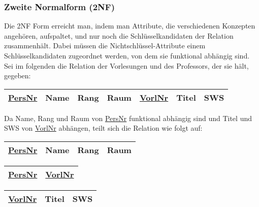 \documentclass[a4paper,parskip=half*,DIV=15,fontsize=11pt]{scrartcl}
\newlength{\currentparskip}
\newenvironment{minipageparskip}
  {\setlength{\currentparskip}{\parskip} %
   \begin{minipage}{\textwidth} %
   \setlength{\parskip}{\currentparskip} %
  }
  {\end{minipage}}
\begin{document}
\subsubsection{Zweite Normalform (2NF)}

Die 2NF Form erreicht man, indem man Attribute, die verschiedenen Konzepten angehören, aufspaltet, und nur noch die Schlüsselkandidaten der Relation zusammenhält. Dabei müssen die Nichtschlüssel-Attribute einem Schlüsselkandidaten zugeordnet werden, von dem sie funktional abhängig sind. Sei im folgenden die Relation der Vorlesungen und des Professors, der sie hält, gegeben:

\begin{minipageparskip}
\begin{center}
\begin{tabular}{| c | c | c | c | c | c | c |}
    \hline
    \underline{PersNr} & Name & Rang & Raum & \underline{VorlNr} & Titel & SWS \\ \hline
\end{tabular}
\end{center}
\end{minipageparskip}

Da Name, Rang und Raum von \underline{PersNr} funktional abhängig sind und Titel und SWS von \underline{VorlNr} abhängen, teilt sich die Relation wie folgt auf:

\begin{minipageparskip}
\begin{minipage}[t]{0.4\textwidth}
\begin{center}
\begin{tabular}{| c | c | c | c |}
    \hline
    \underline{PersNr} & Name & Rang & Raum \\ \hline
\end{tabular}
\end{center}
\end{minipage}
\begin{minipage}[t]{0.2\textwidth}
\begin{center}
\begin{tabular}{| c | c |}
    \hline
    \underline{PersNr} & \underline{VorlNr} \\ \hline
\end{tabular}
\end{center}
\end{minipage}
\begin{minipage}[t]{0.4\textwidth}
\begin{center}
\begin{tabular}{| c | c | c |}
    \hline
    \underline{VorlNr} & Titel & SWS \\ \hline
\end{tabular}
\end{center}
\end{minipage}
\end{minipageparskip}
\end{document}

